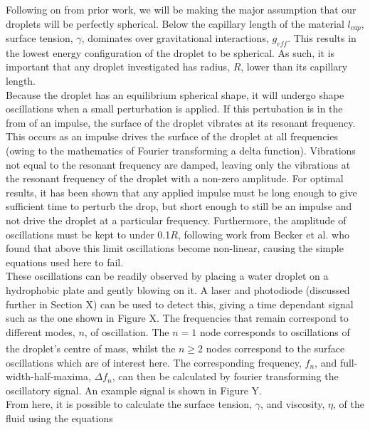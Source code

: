 \documentclass{physics_article_B}
\begin{document}
    Following on from prior work, we will be making the major assumption that our droplets will be perfectly spherical. Below the capillary length of the material $l_{cap}$, surface tension, $\gamma$, dominates over gravitational interactions, $g_{eff}$. This results in the lowest energy configuration of the droplet to be spherical. As such, it is important that any droplet investigated has radius, $R$, lower than its capillary length. \\
    
    Because the droplet has an equilibrium spherical shape, it will undergo shape oscillations when a small perturbation is applied\cite{oscillation}. If this pertubation is in the from of an impulse, the surface of the droplet vibrates at its resonant frequency. This occurs as an impulse drives the surface of the droplet at all frequencies (owing to the mathematics of Fourier transforming a delta function). Vibrations not equal to the resonant frequency are damped, leaving only the vibrations at the resonant frequency of the droplet with a non-zero amplitude. For optimal results, it has been shown that any applied impulse must be long enough to give sufficient time to perturb the drop, but short enough to still be an impulse and not drive the droplet at a particular frequency\cite{temperton2014mechanical}. Furthermore, the amplitude of oscillations must be kept to under 0.1$R$, following work from Becker et al. who found that above this limit oscillations become non-linear, causing the simple equations used here to fail\cite{becker1991experimental}.\\
    
    These oscillations can be readily observed by placing a water droplet on a hydrophobic plate and gently blowing on it. A laser and photodiode (discussed further in Section X) can be used to detect this, giving a time dependant signal such as the one shown in Figure X. The frequencies that remain correspond to different modes, $n$, of oscillation. The $n=1$ node corresponds to oscillations of the droplet's centre of mass\textsuperscript{\cite{miller}}, whilst the $n\geq2$ nodes correspond to the surface oscillations which are of interest here. The corresponding frequency, $f_n$, and full-width-half-maxima, $\Delta f_n$, can then be calculated by fourier transforming the oscillatory signal. An example signal is shown in Figure Y. \\
    
    From here, it is possible to calculate the surface tension, $\gamma$, and viscosity, $\eta$, of the fluid using the equations
 
\end{document}

